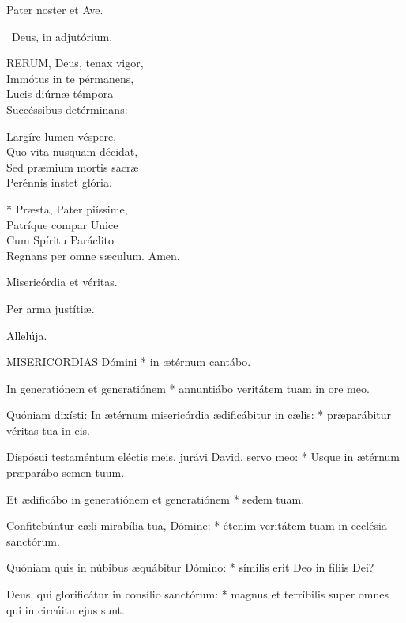 
\sectionornament


Pater noster et Ave.

\V\ Deus, in adjutórium.


\lettrine[lines=2]{R}{ERUM}, Deus, tenax vigor,\\
Immótus in te pérmanens,\\
Lucis diúrnæ témpora\\
Succéssibus detérminans:

Largíre lumen véspere,\\
Quo vita nusquam décidat,\\
Sed præmium mortis sacræ\\
Perénnis instet glória.

* Præsta, Pater piíssime,\\
Patríque compar Unice\\
Cum Spíritu Paráclito\\
Regnans per omne sæculum. Amen.

  Misericórdia et véritas.



 Per arma justítiæ.

  Allelúja.


\lettrine[lines=2]{M}{ISERICORDIAS} Dómini * in ætérnum cantábo.

In generatiónem et generatiónem * annuntiábo veritátem tuam in ore meo.

Quóniam dixísti: In ætérnum misericórdia ædificábitur in cælis: * præparábitur véritas tua in eis.

Dispósui testaméntum eléctis meis, jurávi David, servo meo: * Usque in ætérnum præparábo semen tuum.

Et ædificábo in generatiónem et generatiónem * sedem tuam.

Confitebúntur cæli mirabília tua, Dómine: * étenim veritátem tuam in ecclésia sanctórum.

Quóniam quis in núbibus æquábitur Dómino: * símilis erit Deo in fíliis Dei?

Deus, qui glorificátur in consílio sanctórum: * magnus et terríbilis super omnes qui in circúitu ejus sunt.

